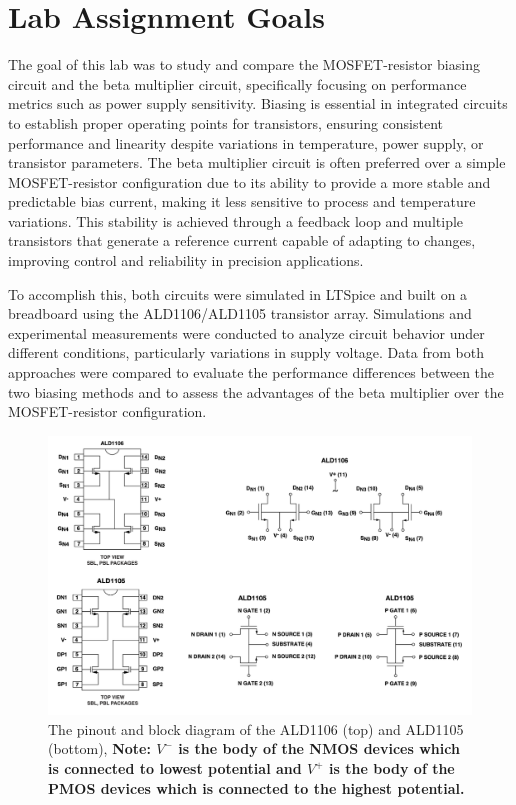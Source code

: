 

\onehalfspacing
\section{Lab Assignment Goals}
\justifying 

The goal of this lab was to study and compare the MOSFET-resistor biasing circuit and the beta multiplier circuit, specifically focusing on performance metrics such as power supply sensitivity. Biasing is essential in integrated circuits to establish proper operating points for transistors, ensuring consistent performance and linearity despite variations in temperature, power supply, or transistor parameters. The beta multiplier circuit is often preferred over a simple MOSFET-resistor configuration due to its ability to provide a more stable and predictable bias current, making it less sensitive to process and temperature variations. This stability is achieved through a feedback loop and multiple transistors that generate a reference current capable of adapting to changes, improving control and reliability in precision applications.  

To accomplish this, both circuits were simulated in LTSpice and built on a breadboard using the ALD1106/ALD1105 transistor array. Simulations and experimental measurements were conducted to analyze circuit behavior under different conditions, particularly variations in supply voltage. Data from both approaches were compared to evaluate the performance differences between the two biasing methods and to assess the advantages of the beta multiplier over the MOSFET-resistor configuration.

\begin{center}
\begin{figure}[ht]
\includegraphics[scale=0.5\linewidth]{Chapter_2/Lab_02_Image_1.png}
\caption{The pinout and block diagram of the ALD1106 (top) and ALD1105 (bottom), \textbf{Note: $V^{-}$ is the body of the NMOS devices which is connected to lowest potential and $V^{+}$ is the body of the PMOS devices which is connected to the highest potential. }}
\label{fig:Ch2_fig1}
\end{figure}
\end{center}


